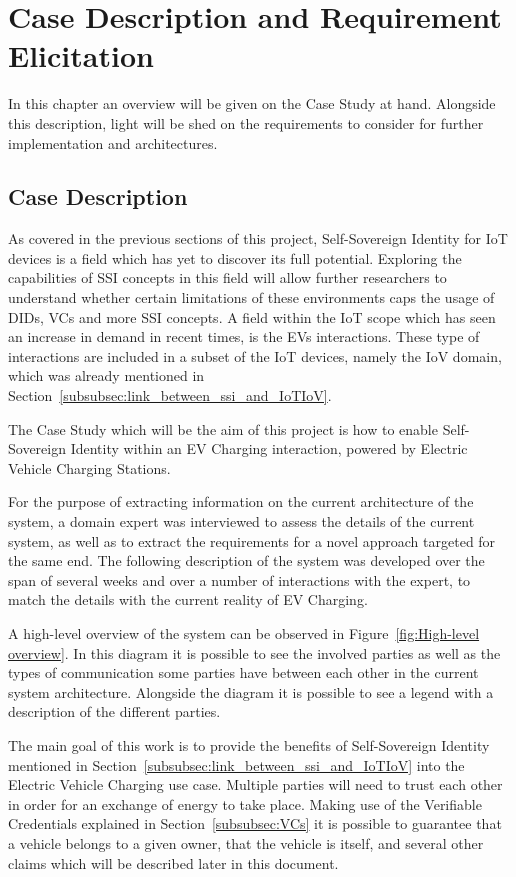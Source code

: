 \section{Case Description and Requirement Elicitation}
\label{sec:requirement_elicitation}

In this chapter an overview will be given on the Case Study at hand. Alongside this description, light will be shed on the requirements to consider for further implementation and architectures.

\subsection{Case Description}
\label{subsec:case_description}

As covered in the previous sections of this project, Self-Sovereign Identity for IoT devices is a field which has yet to discover its full potential. Exploring the capabilities of SSI concepts in this field will allow further researchers to understand whether certain limitations of these environments caps the usage of DIDs, VCs and more SSI concepts. A field within the IoT scope which has seen an increase in demand in recent times, is the \glspl{EV} interactions. These type of interactions are included in a subset of the IoT devices, namely the IoV domain, which was already mentioned in Section~\ref{subsubsec:link_between_ssi_and_IoTIoV}.

The Case Study which will be the aim of this project is how to enable Self-Sovereign Identity within an EV Charging interaction, powered by Electric Vehicle Charging Stations. 

For the purpose of extracting information on the current architecture of the system, a domain expert was interviewed to assess the details of the current system, as well as to extract the requirements for a novel approach targeted for the same end. The following description of the system was developed over the span of several weeks and over a number of interactions with the expert, to match the details with the current reality of EV Charging.

A high-level overview of the system can be observed in Figure~\ref{fig:High-level overview}. In this diagram it is possible to see the involved parties as well as the types of communication some parties have between each other in the current system architecture. Alongside the diagram it is possible to see a legend with a description of the different parties.

The main goal of this work is to provide the benefits of Self-Sovereign Identity mentioned in Section~\ref{subsubsec:link_between_ssi_and_IoTIoV} into the Electric Vehicle Charging use case. Multiple parties will need to trust each other in order for an exchange of energy to take place. Making use of the Verifiable Credentials explained in Section~\ref{subsubsec:VCs} it is possible to guarantee that a vehicle belongs to a given owner, that the vehicle is itself, and several other claims which will be described later in this document.

